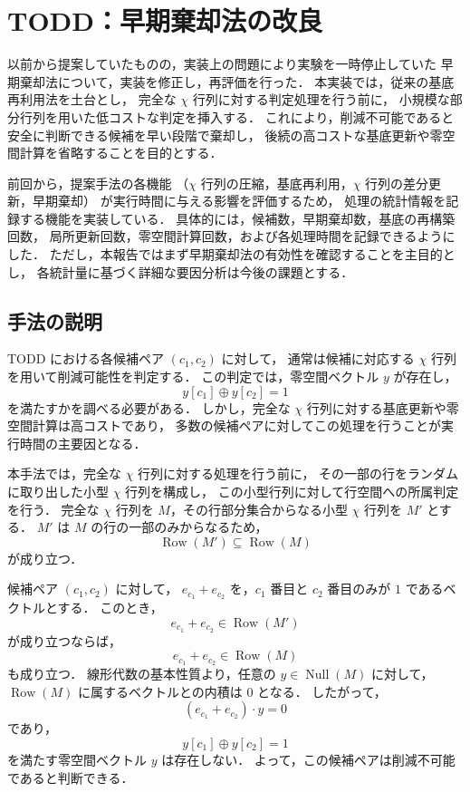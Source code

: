 \section{TODD：早期棄却法の改良}

以前から提案していたものの，実装上の問題により実験を一時停止していた
早期棄却法について，実装を修正し，再評価を行った．
本実装では，従来の基底再利用法を土台とし，
完全な $\chi$ 行列に対する判定処理を行う前に，
小規模な部分行列を用いた低コストな判定を挿入する．
これにより，削減不可能であると安全に判断できる候補を早い段階で棄却し，
後続の高コストな基底更新や零空間計算を省略することを目的とする．

前回から，提案手法の各機能
（$\chi$ 行列の圧縮，基底再利用，$\chi$ 行列の差分更新，早期棄却）
が実行時間に与える影響を評価するため，
処理の統計情報を記録する機能を実装している．
具体的には，候補数，早期棄却数，基底の再構築回数，
局所更新回数，零空間計算回数，および各処理時間を記録できるようにした．
ただし，本報告ではまず早期棄却法の有効性を確認することを主目的とし，
各統計量に基づく詳細な要因分析は今後の課題とする．

\subsection{手法の説明}

TODD における各候補ペア $(c_1,c_2)$ に対して，
通常は候補に対応する $\chi$ 行列を用いて削減可能性を判定する．
この判定では，零空間ベクトル $y$ が存在し，
\[
    y[c_1] \oplus y[c_2] = 1
\]
を満たすかを調べる必要がある．
しかし，完全な $\chi$ 行列に対する基底更新や零空間計算は高コストであり，
多数の候補ペアに対してこの処理を行うことが実行時間の主要因となる．

本手法では，完全な $\chi$ 行列に対する処理を行う前に，
その一部の行をランダムに取り出した小型 $\chi$ 行列を構成し，
この小型行列に対して行空間への所属判定を行う．
完全な $\chi$ 行列を $M$，その行部分集合からなる小型 $\chi$ 行列を $M'$ とする．
$M'$ は $M$ の行の一部のみからなるため，
\[
    \operatorname{Row}(M') \subseteq \operatorname{Row}(M)
\]
が成り立つ．

候補ペア $(c_1,c_2)$ に対して，
$e_{c_1}+e_{c_2}$ を，$c_1$ 番目と $c_2$ 番目のみが $1$ であるベクトルとする．
このとき，
\[
    e_{c_1}+e_{c_2} \in \operatorname{Row}(M')
\]
が成り立つならば，
\[
    e_{c_1}+e_{c_2} \in \operatorname{Row}(M)
\]
も成り立つ．
線形代数の基本性質より，任意の
$y \in \operatorname{Null}(M)$ に対して，
$\operatorname{Row}(M)$ に属するベクトルとの内積は $0$ となる．
したがって，
\[
    (e_{c_1}+e_{c_2}) \cdot y = 0
\]
であり，
\[
    y[c_1] \oplus y[c_2] = 1
\]
を満たす零空間ベクトル $y$ は存在しない．
よって，この候補ペアは削減不可能であると判断できる．

